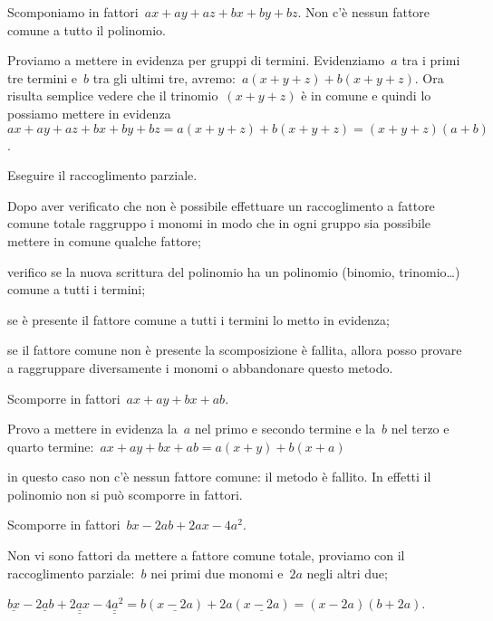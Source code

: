  \begin{esempio}
Scomponiamo in fattori~$ax+ay+az+bx+by+bz$. Non c'è nessun fattore comune a 
tutto il polinomio.

Proviamo a mettere in evidenza per gruppi di termini. Evidenziamo~$a$ tra i 
primi tre termini e~$b$ tra gli ultimi tre, 
avremo:~$a(x+y+z)+b(x+y+z)$. Ora risulta semplice vedere che il 
trinomio~$(x+y+z)$ è in comune e quindi lo possiamo mettere 
in evidenza~$ax+ay+az+bx+by+bz=a(x+y+z)+b(x+y+z)=(x+y+z)(a+b)$.
 \end{esempio}

\begin{procedura}
Eseguire il raccoglimento parziale.
\begin{enumeratea}
\item Dopo aver verificato che non è possibile effettuare un raccoglimento a 
 fattore comune totale raggruppo i monomi in modo che in ogni gruppo sia 
 possibile mettere in comune qualche fattore;
\item verifico se la nuova scrittura del polinomio ha un polinomio 
 (binomio, trinomio\ldots) comune a tutti i termini;
\item se è presente il fattore comune a tutti i termini lo metto in evidenza;
\item se il fattore comune non è presente la scomposizione è fallita, allora 
 posso provare a raggruppare diversamente i monomi o abbandonare questo metodo.
\end{enumeratea}
\end{procedura}

 \begin{esempio}
Scomporre in fattori~$ax+ay+bx+ab$.
  \begin{enumeratea}
  \item Provo a mettere in evidenza la~$a$ nel primo e secondo termine e 
   la~$b$ nel terzo e quarto termine:~$ax+ay+bx+ab=a(x+y)+b(x+a)$
  \item in questo caso non c'è nessun fattore comune: il metodo è fallito. 
   In effetti il polinomio non si può scomporre in fattori.
  \end{enumeratea}
 \end{esempio}

 \begin{esempio}
Scomporre in fattori~$bx-2ab+2ax-4a^{2}$.
 \begin{enumeratea}
 \item Non vi sono fattori da mettere a fattore comune totale, proviamo con 
  il raccoglimento parziale:~$b$ nei primi due monomi e~$2a$ negli altri due;
 \item $\underline{bx} -\underline{2ab}+\underline{\underline{2ax}}-
        \underline{\underline{4a^{2}}}=
        b(\underline{x-2a})+2a(\underline{x-2a})=(x-2a)(b+2a)$.
 \end{enumeratea}
 \end{esempio}

